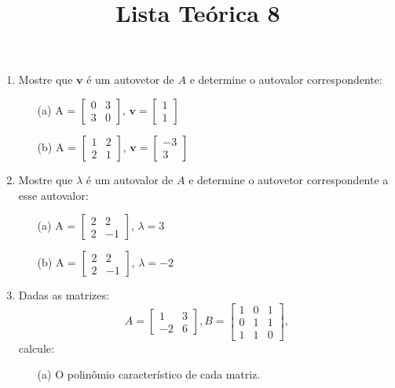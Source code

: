\documentclass[a4paper,12pt]{article}
\title{Lista Teórica 8}
\author{}
\date{}
\begin{document}
\maketitle
\begin{enumerate}
\item Mostre que $\mathbf{v}$ é um autovetor de $A$ e determine o autovalor correspondente:
\begin{enumerate}
    \item[(a)] A = $\begin{bmatrix} 0 & 3 \\ 3 & 0 \end{bmatrix}$, $\mathbf{v} = \begin{bmatrix} 1 \\ 1 \end{bmatrix}$
    \item[(b)] A = $\begin{bmatrix} 1 & 2 \\ 2 & 1 \end{bmatrix}$, $\mathbf{v} = \begin{bmatrix} -3 \\ 3 \end{bmatrix}$
\end{enumerate}
\item Mostre que $\lambda$ é um autovalor de $A$ e determine o autovetor correspondente a esse autovalor:
\begin{enumerate}
    \item[(a)] A = $\begin{bmatrix} 2 & 2 \\ 2 & -1 \end{bmatrix}$, $\lambda = 3$
    \item[(b)] A = $\begin{bmatrix} 2 & 2 \\ 2 & -1 \end{bmatrix}$, $\lambda = -2$
\end{enumerate}
\item Dadas as matrizes:
$$A = \begin{bmatrix} 1 & 3 \\ -2 & 6\end{bmatrix},
B = \begin{bmatrix} 1 & 0 & 1 \\ 0 & 1 & 1 \\ 1 & 1 & 0 \end{bmatrix},
$$
calcule:
\begin{enumerate}
    \item[(a)] O polinômio característico de cada matriz.

\end{enumerate}
\end{enumerate}
\end{document}
